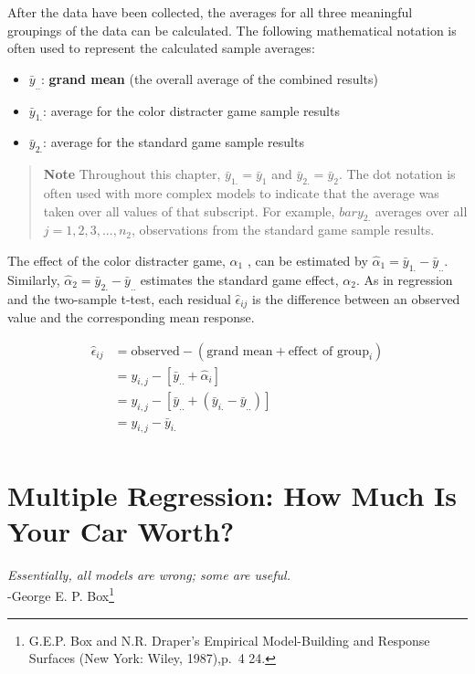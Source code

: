 \documentclass[
]{report}
\providecommand{\tightlist}{%
  \setlength{\itemsep}{0pt}\setlength{\parskip}{0pt}}
\begin{document}
After the data have been collected, the averages for all three meaningful groupings of the data can be calculated. The following mathematical notation is often used to represent the calculated sample averages:

\begin{itemize}
\tightlist
\item
  \(\bar{y}_{..}\): \textbf{grand mean} (the overall average of the combined results)
\item
  \(\bar{y}_{1.}\): average for the color distracter game sample results
\item
  \(\bar{y}_{2.}\): average for the standard game sample results
\end{itemize}

\begin{quote}
\textbf{Note}
Throughout this chapter, \(\bar{y}_{1.} = \bar{y}_{1}\) and \(\bar{y}_{2.} = \bar{y}_{2}\). The dot notation is often used with more complex models
to indicate that the average was taken over all values of that subscript. For example, \(bar{y}_{2.}\) averages over all
\(j = 1, 2, 3, ... , n_2\), observations from the standard game sample results.
\end{quote}

The effect of the color distracter game, \(\alpha_1\) , can be estimated by \(\hat{\alpha}_1 = \bar{y}_{1.} - \bar{y}_{..}\). Similarly, \(\hat{\alpha}_2 = \bar{y}_{2.} - \bar{y}_{..}\)
estimates the standard game effect, \(\alpha_2\). As in regression and the two-sample t-test, each residual \(\hat{\epsilon}_{ij}\) is the
difference between an observed value and the corresponding mean response.

\[
\begin{aligned}
\hat{\epsilon}_{ij}  
  &= \text{observed} - (\text{grand mean} + \text{effect of group}_i)\\
  &= y_{i,j} - [\bar{y}_{..} + \hat{\alpha}_i]\\
  &= y_{i,j} - [\bar{y}_{..} + (\bar{y}_{i.} - \bar{y}_{..})]\\
  &= y_{i,j} - \bar{y}_{i.}\\
\end{aligned}  
\]

\chapter{Multiple Regression: How Much Is Your Car Worth?}\label{multiple-regression-how-much-is-your-car-worth}

\emph{Essentially, all models are wrong; some are useful.}\\
-George E. P. Box\footnote{G.E.P. Box and N.R. Draper's Empirical Model-Building and Response Surfaces (New York: Wiley, 1987),p.~4 24.}
\end{document}
